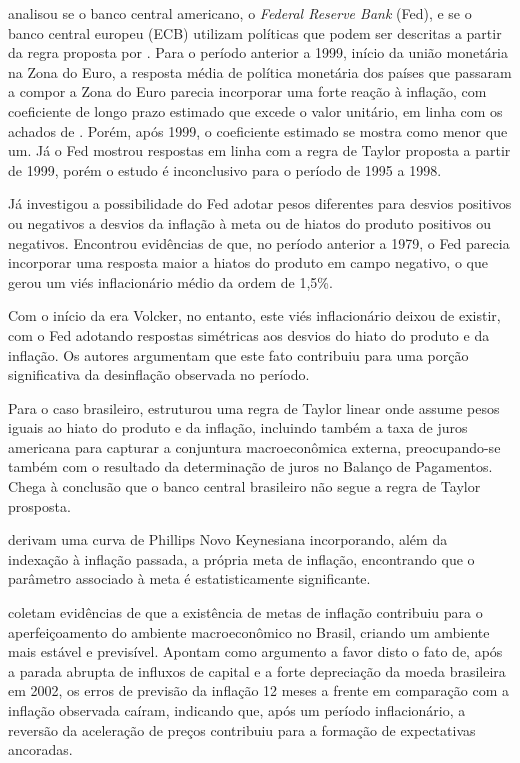 \documentclass[
	article,			%
	11pt,				%
	oneside,			%
	a4paper,			%
	english,			%
	brazil,				%
	]{abntex2}
\begin{document}
	 analisou se o banco central americano, o \textit{Federal Reserve Bank} (Fed), e se o banco central europeu (ECB) utilizam políticas que podem ser descritas a partir da regra proposta por . Para o período anterior a 1999, início da união monetária na Zona do Euro, a resposta média de política monetária dos países que passaram a compor a Zona do Euro parecia incorporar uma forte reação à inflação, com coeficiente de longo prazo estimado que excede o valor unitário, em linha com os achados de . Porém, após 1999, o coeficiente estimado se mostra como menor que um. Já o Fed mostrou respostas em linha com a regra de Taylor proposta a partir de 1999, porém o estudo é inconclusivo para o período de 1995 a 1998.
	
	Já  investigou a possibilidade do Fed adotar pesos diferentes para desvios positivos ou negativos a desvios da inflação à meta ou de hiatos do produto positivos ou negativos. Encontrou evidências de que, no período anterior a 1979, o Fed parecia incorporar uma resposta maior a hiatos do produto em campo negativo, o que gerou um viés inflacionário médio da ordem de 1,5\%. 
	
	Com o início da era Volcker, no entanto, este viés inflacionário deixou de existir, com o Fed adotando respostas simétricas aos desvios do hiato do produto e da inflação. Os autores argumentam que este fato contribuiu para uma porção significativa da desinflação observada no período.
	
	Para o caso brasileiro,  estruturou uma regra de Taylor linear onde assume pesos iguais ao hiato do produto e da inflação, incluindo também a taxa de juros americana para capturar a conjuntura macroeconômica externa, preocupando-se também com o resultado da determinação de juros no Balanço de Pagamentos. Chega à conclusão que o banco central brasileiro não segue a regra de Taylor prosposta.
	
	 derivam uma curva de Phillips Novo Keynesiana incorporando, além da indexação à inflação passada, a própria meta de inflação, encontrando que o parâmetro associado à meta é estatisticamente significante.
	
	 coletam evidências de que a existência de metas de inflação contribuiu para o aperfeiçoamento do ambiente macroeconômico no Brasil, criando um ambiente mais estável e previsível. Apontam como argumento a favor disto o fato de, após a parada abrupta de influxos de capital e a forte depreciação da moeda brasileira em 2002, os erros de previsão da inflação 12 meses a frente em comparação com a inflação observada caíram, indicando que, após um período inflacionário, a reversão da aceleração de preços contribuiu para a formação de expectativas ancoradas.
	
\end{document}
